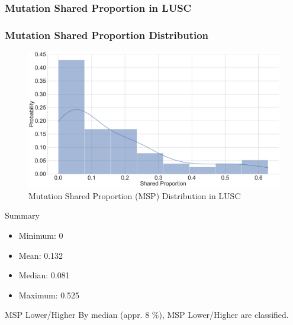 \documentclass{beamer}
\begin{document}
    \subsubsection{Mutation Shared Proportion in LUSC}
    \begin{frame}[allowframebreaks]
        \frametitle{Mutation Shared Proportion Distribution}

        \begin{figure}
            \includegraphics[width=0.9 \linewidth]{figures/Mutation_Shared_Proportion/Histogram/BWA.SQC.SharedProportion.pdf}
            \caption{Mutation Shared Proportion (MSP) Distribution in LUSC}
        \end{figure}

        \begin{block}{Summary}
            \begin{itemize}
                \item Minimum: 0
                \item Mean: 0.132
                \item Median: 0.081
                \item Maximum: 0.525
            \end{itemize}
        \end{block}

        \begin{exampleblock}{MSP Lower/Higher}
            By median (appr. 8 \%), MSP Lower/Higher are classified.
        \end{exampleblock}
    \end{frame}
\end{document}
